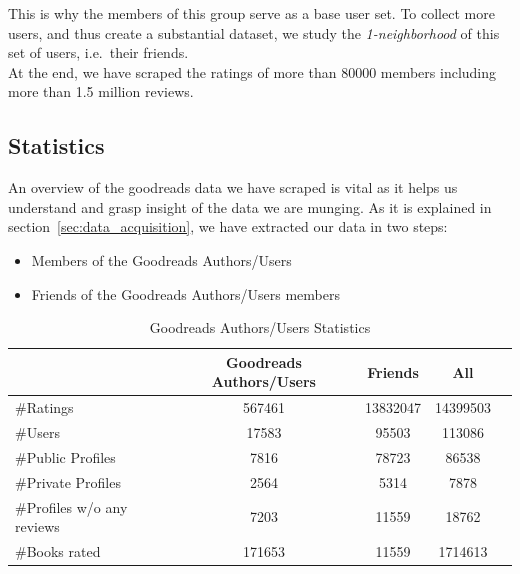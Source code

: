 \documentclass[11pt]{article}
\begin{document}
This is why the members of this group serve as a base user set.
To collect more users, and thus create a substantial dataset, we study the {\it 1-neighborhood} of this set of users, i.e.\ their friends.\\
At the end, we have scraped the ratings of more than 80000 members including more than 1.5 million reviews.

\subsection{Statistics}

An overview of the goodreads data we have scraped is vital as it helps us understand and grasp insight of the data we are munging.
As it is explained in section~\ref{sec:data_acquisition}, we have extracted our data in two steps:
\begin{itemize}
\item Members of the Goodreads Authors/Users
\item Friends of the Goodreads Authors/Users members
\end{itemize}

\begin{table}[h]
\begin{center}
\begin{tabular}{lcccc}
\hline
                           &  Goodreads Authors/Users    &   Friends                &   All        \\ \hline
\#Ratings                  &  567461                     &   13832047               &   14399503  \\ \hline
\#Users                    &  17583                      &   95503                  &   113086     \\ \hline
\#Public Profiles          &  7816                       &   78723                  &   86538     \\ \hline
\#Private Profiles         &  2564                       &   5314                   &   7878      \\ \hline
\#Profiles w/o any reviews &  7203                       &   11559                  &   18762      \\ \hline
\#Books rated              &  171653                     &   11559                  &   1714613      \\ \hline
\end{tabular}
\end{center}
\caption{Goodreads Authors/Users Statistics} \label{table:crawl_stat}
\end{table}
\end{document}
